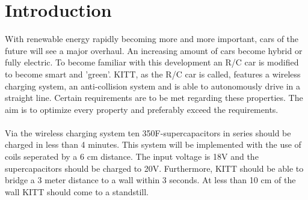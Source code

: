 \documentclass[final]{scrreprt} %
\begin{document}
\chapter{Introduction}
With renewable energy rapidly becoming more and more important, cars of the future will see a major overhaul. 
An increasing amount of cars become hybrid or fully electric. 
To become familiar with this development an R/C car is modified to become smart and 'green'.
KITT, as the R/C car is called, features a wireless charging system, an anti-collision system and is able to autonomously drive in a straight line. 
Certain requirements are to be met regarding these properties. 
The aim is to optimize every property and preferably exceed the requirements.
\\\\
Via the wireless charging system ten 350F-supercapacitors in series should be charged in less than 4 minutes. 
This system will be implemented with the use of coils seperated by a 6 cm distance. 
The input voltage is 18V and the supercapacitors should be charged to 20V. 
Furthermore, KITT should be able to bridge a 3 meter distance to a wall within 3 seconds. 
At less than 10 cm of the wall KITT should come to a standstill.
\end{document}
